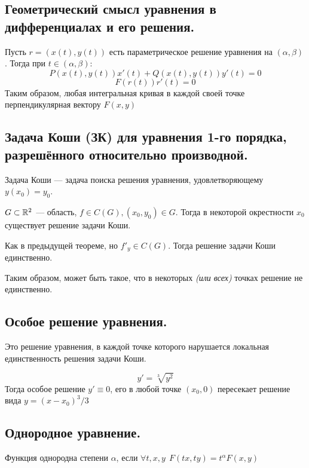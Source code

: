 \subsection*{Геометрический смысл уравнения в дифференциалах и его решения.}

Пусть \(r = (x(t), y(t))\) есть параметрическое решение уравнения на \((\alpha, \beta)\). Тогда при \(t\in(\alpha, \beta)\):
\[P(x(t), y(t))x'(t) + Q(x(t), y(t))y'(t) = 0\]
\[F(r(t))r'(t) = 0\]
Таким образом, любая интегральная кривая в каждой своей точке перпендикулярная вектору \(F(x, y)\)

\subsection*{Задача Коши (ЗК) для уравнения 1-го порядка, разрешённого относительно производной.}

Задача Коши --- задача поиска решения уравнения, удовлетворяющему \(y(x_0) = y_0\).

\begin{theorem}
    \(G\subset\mathbb{R}^2\) --- область, \(f\in C(G), (x_0, y_0)\in G\). Тогда в некоторой окрестности \(x_0\) существует решение задачи Коши.
\end{theorem}
\begin{theorem}
    Как в предыдущей теореме, но \(f'_y\in C(G)\). Тогда решение задачи Коши единственно.
\end{theorem}

Таким образом, может быть такое, что в некоторых \textit{(или всех)} точках решение не единственно.

\subsection*{Особое решение уравнения.}

Это решение уравнения, в каждой точке которого нарушается локальная единственность решения задачи Коши.

\begin{example}
    \[y' = \sqrt[3]{y^2}\]
    Тогда особое решение \(y' \equiv 0\), его в любой точке \((x_0, 0)\) пересекает решение вида \(y = (x - x_0)^3 / 3\)
\end{example}

\subsection*{Однородное уравнение.}

Функция однородна степени \(\alpha\), если \(\forall t,x,y \ \ F(tx, ty) = t^\alpha F(x, y)\)

